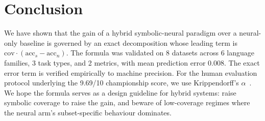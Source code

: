 \documentclass[11pt,a4paper]{article}
\begin{document}
\section{Conclusion}
\label{sec:conclusion}
We have shown that the gain of a hybrid symbolic-neural paradigm over
a neural-only baseline is governed by an exact decomposition whose
leading term is $\text{cov} \cdot (\text{acc}_s - \text{acc}_n)$. The
formula was validated on 8 datasets across 6 language families, 3 task
types, and 2 metrics, with mean prediction error $0.008$. The exact
error term is verified empirically to machine precision. For the human evaluation protocol underlying the 9.69/10 championship
score, we use Krippendorff's $\alpha$~\cite{krippendorff2011computing}.
We hope the formula serves as a design guideline for hybrid systems: raise
symbolic coverage to raise the gain, and beware of low-coverage
regimes where the neural arm's subset-specific behaviour dominates.



\end{document}
